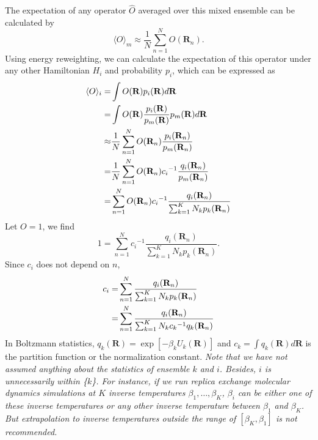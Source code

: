 The expectation of any operator $\hat{O}$ averaged over this mixed ensemble can be calculated by
\begin{equation}
\langle O\rangle_m\approx\frac 1N \sum\limits_{n=1}^NO(\mathbf{R}_n).
\end{equation}
Using energy reweighting\cite{TorrieJComputP1977}, we can calculate the expectation of this operator under any other Hamiltonian $H_i$ and probability $p_i$, which can be expressed as
\begin{align}
\langle O\rangle_i=&\int O(\mathbf{R})p_i(\mathbf{R})d\mathbf{R}\notag\\
                  =&\int O(\mathbf{R})\frac{p_i(\mathbf{R})}{p_m(\mathbf{R})}p_m(\mathbf{R})d\mathbf{R}\notag\\
                  \approx&\frac 1N\sum\limits_{n=1}^N O(\mathbf{R}_n)\frac{p_i(\mathbf{R}_n)}{p_m(\mathbf{R}_n)}\notag\\
                  =&\frac 1N\sum\limits_{n=1}^N O(\mathbf{R}_n){c_i}^{-1}\frac{q_i(\mathbf{R}_n)}{p_m(\mathbf{R}_n)}\notag\\
                  =&\sum\limits_{n=1}^N O(\mathbf{R}_n){c_i}^{-1}\frac{q_i(\mathbf{R}_n)}{\sum_{k=1}^{K}N_kp_k(\mathbf{R}_n)}
                  \label{Eq:FEM:MBAR:Oexpect}
\end{align}
Let $O=1$, we find
\begin{equation}
1=\sum\limits_{n=1}^N {c_i}^{-1}\frac{q_i(\mathbf{R}_n)}{\sum_{k=1}^{K}N_kp_k(\mathbf{R}_n)}.
\end{equation}
Since $c_i$ does not depend on $n$,
\begin{align}
c_i=&\sum\limits_{n=1}^N \frac{q_i(\mathbf{R}_n)}{\sum_{k=1}^{K}N_kp_k(\mathbf{R}_n)}\notag\\
   =&\sum\limits_{n=1}^N \frac{q_i(\mathbf{R}_n)}{\sum_{k=1}^{K}N_k{c_k}^{-1}q_k(\mathbf{R}_n)}
   \label{Eq:FEM:MBAR:c_i}
\end{align}
In Boltzmann statistics, $q_k(\mathbf{R})=\exp{\left[-\beta_kU_k(\mathbf{R})\right]}$ and $c_k=\int q_k(\mathbf{R})d\mathbf{R}$ is the partition function or the normalization constant. \textit{Note that we have not assumed anything about the statistics of ensemble $k$ and $i$. Besides, $i$ is unnecessarily within \{$k$\}. For instance, if we run replica exchange molecular dynamics simulations at $K$ inverse temperatures $\beta_1,\dots,\beta_K$, $\beta_i$ can be either one of these inverse temperatures or any other inverse temperature between $\beta_1$ and $\beta_K$. But extrapolation to inverse temperatures outside the range of $\left[\beta_K,\beta_1\right]$ is not recommended.}

